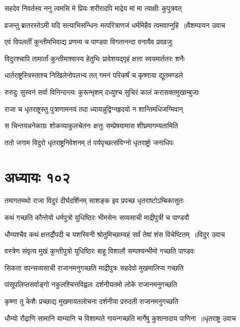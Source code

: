 \twolineshloka
{सहदेव निवर्तस्व ननु त्वमसि मे प्रियः}
{शरीरादपि माद्रेय मां मा त्याक्षीः कुपुत्रवत्}


\twolineshloka
{व्रजन्तु ब्रातरस्तेऽमी यदि सत्याभिसन्धिनः}
{मत्परित्राणजं धर्ममिहैव त्वमवाप्नुहि ॥वैशम्पायन उवाच}


\twolineshloka
{एवं विपलतीं कुन्तीमभिवाद्य प्रणम्य च}
{पाण्डवा विगतानन्दा वनायैव प्रवव्रजुः}


\twolineshloka
{विदुरश्चापि तामार्तां कुन्तीमाश्वास्य हेतुभिः}
{प्रावेशयद्गृहं क्षत्ता स्वयमार्ततरः शनैः}


\twolineshloka
{धार्तराष्ट्रस्त्रिस्ताश्च निखिलेनोपलभ्य तत्}
{गमनं परिकर्षं च कृष्णाया द्यूतमण्डले}


\twolineshloka
{रुरुदुः सुस्वनं सर्वा विनिन्दन्त्यः कुरून्भृशम्}
{दध्युश्च सुचिरं कालं करासक्तमुखाम्बुजाः}


\twolineshloka
{राजा च धृतराष्ट्रस्तु पुत्राणामनयं तदा}
{ध्यायन्नुद्विग्नहृदयो न शान्तिमधिजग्मिवान्}


\twolineshloka
{स चिन्तयन्ननेकाग्रः शोकव्याकुलचेतनः}
{क्षत्तुः सम्प्रेषयामास शीघ्रमागम्यतामिति}


\twolineshloka
{ततो जगाम विदुरो धृतराष्ट्रनिवेशनम्}
{तं पर्यपृच्छत्संविग्नो धृतराष्ट्रो जनाधिपः}


\chapter{अध्यायः १०२}
\twolineshloka
{तमागतमथो राजा विदुरं दीर्घदर्शिनम्}
{साशङ्क इव प्रपच्छ धृतराष्टोऽम्बिकासुतः}


\twolineshloka
{कथं गच्छति कौन्तेयो धर्मपुत्रो युधिष्ठिरः}
{भीमसेनः सव्यसाची माद्रीपुत्री च पाण्डवौ}


\twolineshloka
{धौम्यश्चैव कथं क्षत्तर्द्रौपदी च यशस्विनी}
{श्रोतुमिच्छाम्यहं सर्वं तेषां शंस विचेष्टितम् ॥विदुर उवाच}


\twolineshloka
{वस्त्रेण संवृत्य मुखं कुन्तीपुत्रो युधिष्ठिरः}
{बाहू विशालौ सम्पश्यन्भीमो गच्छति पाण्डवः}


\twolineshloka
{सिकता वपन्सव्यसाची राजानमनुगच्छति}
{माद्रीपुत्रः सहदेवो मुखमालिप्य गच्छति}


\twolineshloka
{पांसूपलिप्तसर्वाङ्गो नकुलश्चित्तविह्वलः}
{दर्शनीयतमो लोके राजानमनुगच्छति}


\twolineshloka
{कृष्णा तु केशैः प्रच्छाद्य मुखमायतलोचना}
{दर्शनीया प्ररुदती राजानमनुगच्छति}


\twolineshloka
{धौम्यो रौद्राणि सामानि याम्यानि च विशाम्पते}
{गायन्गच्छति मार्गेषु कुशानादाय पाणिना ॥धृतराष्ट्र उवाच}


